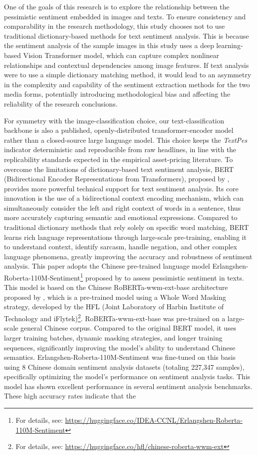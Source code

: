 \documentclass[AER]{AEA}
\begin{document}
One of the goals of this research is to explore the relationship between the pessimistic sentiment embedded in images and texts. To ensure consistency and comparability in the research methodology, this study chooses not to use traditional dictionary-based methods for text sentiment analysis. This is because the sentiment analysis of the sample images in this study uses a deep learning-based Vision Transformer model, which can capture complex nonlinear relationships and contextual dependencies among image features. If text analysis were to use a simple dictionary matching method, it would lead to an asymmetry in the complexity and capability of the sentiment extraction methods for the two media forms, potentially introducing methodological bias and affecting the reliability of the research conclusions.

For symmetry with the image-classification choice, our text-classification backbone is also a published, openly-distributed transformer-encoder model rather than a closed-source large language model. This choice keeps the \textit{TextPes} indicator deterministic and reproducible from raw headlines, in line with the replicability standards expected in the empirical asset-pricing literature. To overcome the limitations of dictionary-based text sentiment analysis, BERT (Bidirectional Encoder Representations from Transformers), proposed by \citet{devlin2018bert}, provides more powerful technical support for text sentiment analysis. Its core innovation is the use of a bidirectional context encoding mechanism, which can simultaneously consider the left and right context of words in a sentence, thus more accurately capturing semantic and emotional expressions. Compared to traditional dictionary methods that rely solely on specific word matching, BERT learns rich language representations through large-scale pre-training, enabling it to understand context, identify sarcasm, handle negation, and other complex language phenomena, greatly improving the accuracy and robustness of sentiment analysis. This paper adopts the Chinese pre-trained language model Erlangshen-Roberta-110M-Sentiment\footnote{For details, see: \url{https://huggingface.co/IDEA-CCNL/Erlangshen-Roberta-110M-Sentiment}} proposed by \citet{fengshenbang} to assess pessimistic sentiment in texts. This model is based on the Chinese RoBERTa-wwm-ext-base architecture proposed by \citet{cui2020revisiting}, which is a pre-trained model using a Whole Word Masking strategy, developed by the HFL (Joint Laboratory of Harbin Institute of Technology and iFlytek)\footnote{For details, see: \url{https://huggingface.co/hfl/chinese-roberta-wwm-ext}}. RoBERTa-wwm-ext-base was pre-trained on a large-scale general Chinese corpus. Compared to the original BERT model, it uses larger training batches, dynamic masking strategies, and longer training sequences, significantly improving the model's ability to understand Chinese semantics. Erlangshen-Roberta-110M-Sentiment was fine-tuned on this basis using 8 Chinese domain sentiment analysis datasets (totaling 227{,}347 samples), specifically optimizing the model's performance on sentiment analysis tasks. This model has shown excellent performance in several sentiment analysis benchmarks. These high accuracy rates indicate that the 
\end{document}
